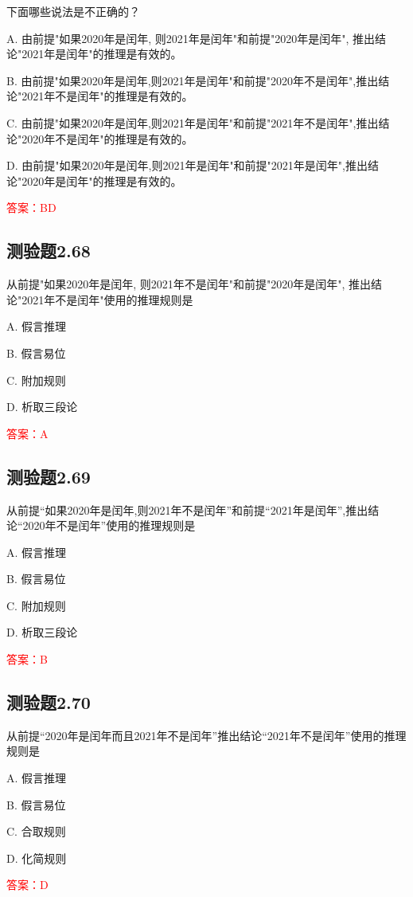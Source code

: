 \documentclass[UTF8, heading=true]{ctexart}
\begin{document}
下面哪些说法是不正确的？

A. 由前提"如果2020年是闰年, 则2021年是闰年"和前提"2020年是闰年", 推出结论"2021年是闰年"的推理是有效的。

B. 由前提"如果2020年是闰年,则2021年是闰年"和前提"2020年不是闰年",推出结论"2021年不是闰年"的推理是有效的。

C. 由前提"如果2020年是闰年,则2021年是闰年"和前提"2021年不是闰年",推出结论"2020年不是闰年"的推理是有效的。

D. 由前提"如果2020年是闰年,则2021年是闰年"和前提"2021年是闰年",推出结论"2020年是闰年"的推理是有效的。

\textcolor{red}{答案：BD}

\subsection{测验题2.68}

从前提"如果2020年是闰年, 则2021年不是闰年"和前提"2020年是闰年", 推出结论"2021年不是闰年"使用的推理规则是

A. 假言推理

B. 假言易位

C. 附加规则

D. 析取三段论

\textcolor{red}{答案：A}

\subsection{测验题2.69}

从前提“如果2020年是闰年,则2021年不是闰年”和前提“2021年是闰年”,推出结论“2020年不是闰年”使用的推理规则是

A. 假言推理

B. 假言易位

C. 附加规则

D. 析取三段论

\textcolor{red}{答案：B}

\subsection{测验题2.70}

从前提“2020年是闰年而且2021年不是闰年”推出结论“2021年不是闰年”使用的推理规则是

A. 假言推理

B. 假言易位

C. 合取规则

D. 化简规则

\textcolor{red}{答案：D}
\end{document}
